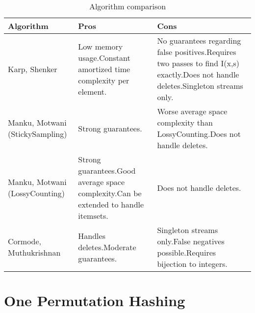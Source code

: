 \documentclass[a4paper]{article}
\begin{document}
\begin{table}
{\scriptsize 
\begin{tabulary}{1\textwidth}{LLL}
\hline \textbf{Algorithm}  %
& \textbf{Pros} & \textbf{Cons} \\ 
\hline Karp, Shenker %
& Low memory usage.\newline Constant amortized time complexity per element. & No guarantees regarding false positives.\newline Requires two passes to find I(x,s) exactly.\newline Does not handle deletes.\newline Singleton streams only. \\ 
\hline Manku, Motwani (StickySampling) %
& Strong guarantees. & Worse average space complexity than LossyCounting.\newline Does not handle deletes. \\ 
\hline Manku, Motwani (LossyCounting) %
& Strong guarantees.\newline Good average space complexity.\newline Can be extended to handle itemsets.  & Does not handle deletes. \\ 
\hline Cormode, Muthukrishnan  %
& Handles deletes.\newline Moderate guarantees. & Singleton streams only.\newline False negatives possible.\newline Requires bijection to integers. \\ 
\hline 

\end{tabulary}
}
\caption{Algorithm comparison}
\label{ComparisonTable}
\end{table}




\section{One Permutation Hashing}
\end{document}
